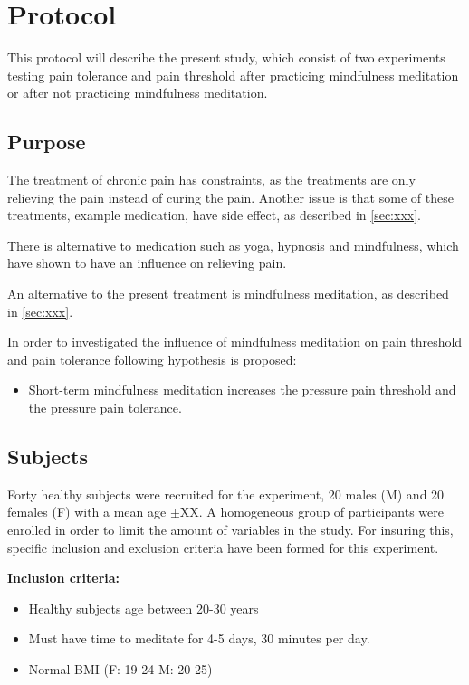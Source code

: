 \section{Protocol}
This protocol will describe the present study, which consist of two experiments testing pain tolerance and pain threshold after practicing mindfulness meditation or after not practicing mindfulness meditation. 

\subsection{Purpose}
The treatment of chronic pain has constraints, as the treatments are only relieving the pain instead of curing the pain. Another issue is that some of these treatments, example medication, have side effect, as described in \ref{sec:xxx}. 

There is alternative to medication such as yoga, hypnosis and mindfulness, which have shown to have an influence on relieving pain.

An alternative to the present treatment is mindfulness meditation, as described in \ref{sec:xxx}. 

In order to investigated the influence of mindfulness meditation on pain threshold and pain tolerance following hypothesis is proposed:
\vspace{-.5cm}
\begin{itemize}
\item Short-term mindfulness meditation increases the pressure pain threshold and the pressure pain tolerance.
\end{itemize}

\subsection{Subjects}
Forty healthy subjects were recruited for the experiment, 20 males (M) and 20 females (F) with a mean age $\pm$XX. A homogeneous group of participants were enrolled in order to limit the amount of variables in the study. For insuring this, specific inclusion and exclusion criteria have been formed for this experiment. 

\textbf{Inclusion criteria:}
\vspace{-.5cm}
\begin{itemize}
	\item Healthy subjects age between 20-30 years
	\vspace{-.3cm}
	\item Must have time to meditate for 4-5 days, 30 minutes per day.
	\vspace{-.3cm}
	\item Normal BMI (F: 19-24 M: 20-25)
\end{itemize}

